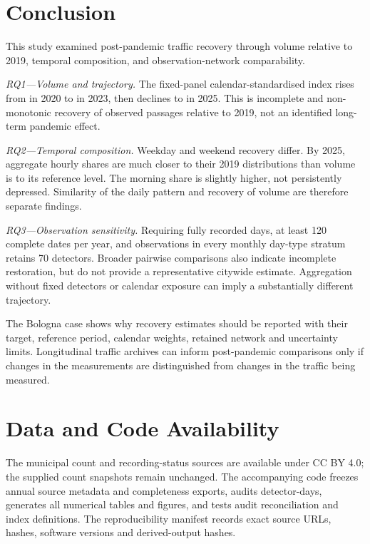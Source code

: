 \documentclass[]{interact}
\begin{document}
\section{Conclusion}
This study examined post-pandemic traffic recovery through volume relative to 2019, temporal composition, and observation-network comparability.

\emph{RQ1---Volume and trajectory.} The fixed-panel calendar-standardised index rises from \IndexTwenty{} in 2020 to \IndexTwentyThree{} in 2023, then declines to \IndexTwentyFive{} in 2025. This is incomplete and non-monotonic recovery of observed passages relative to 2019, not an identified long-term pandemic effect.

\emph{RQ2---Temporal composition.} Weekday and weekend recovery differ. By 2025, aggregate hourly shares are much closer to their 2019 distributions than volume is to its reference level. The morning share is slightly higher, not persistently depressed. Similarity of the daily pattern and recovery of volume are therefore separate findings.

\emph{RQ3---Observation sensitivity.} Requiring fully recorded days, at least 120 complete dates per year, and observations in every monthly day-type stratum retains 70 detectors. Broader pairwise comparisons also indicate incomplete restoration, but do not provide a representative citywide estimate. Aggregation without fixed detectors or calendar exposure can imply a substantially different trajectory.

The Bologna case shows why recovery estimates should be reported with their target, reference period, calendar weights, retained network and uncertainty limits. Longitudinal traffic archives can inform post-pandemic comparisons only if changes in the measurements are distinguished from changes in the traffic being measured.

\section*{Data and Code Availability}
The municipal count and recording-status sources are available under CC BY 4.0; the supplied count snapshots remain unchanged. The accompanying code freezes annual source metadata and completeness exports, audits detector-days, generates all numerical tables and figures, and tests audit reconciliation and index definitions. The reproducibility manifest records exact source URLs, hashes, software versions and derived-output hashes.
\end{document}
